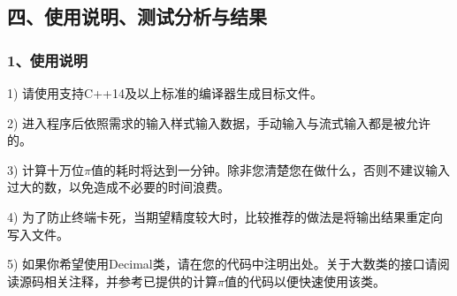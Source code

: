 \documentclass[UTF8, a4paper]{ctexart}
\begin{document}
\subsection*{四、使用说明、测试分析与结果}
\subsubsection*{1、使用说明}
1) 请使用支持C++14及以上标准的编译器生成目标文件。 \par
2) 进入程序后依照需求的输入样式输入数据，手动输入与流式输入都是被允许的。 \par
3) 计算十万位$\pi$值的耗时将达到一分钟。除非您清楚您在做什么，否则不建议输入过大的数，以免造成不必要的时间浪费。 \par
4) 为了防止终端卡死，当期望精度较大时，比较推荐的做法是将输出结果重定向写入文件。 \par
5) 如果你希望使用Decimal类，请在您的代码中注明出处。关于大数类的接口请阅读源码相关注释，并参考已提供的计算$\pi$值的代码以便快速使用该类。
\end{document}
